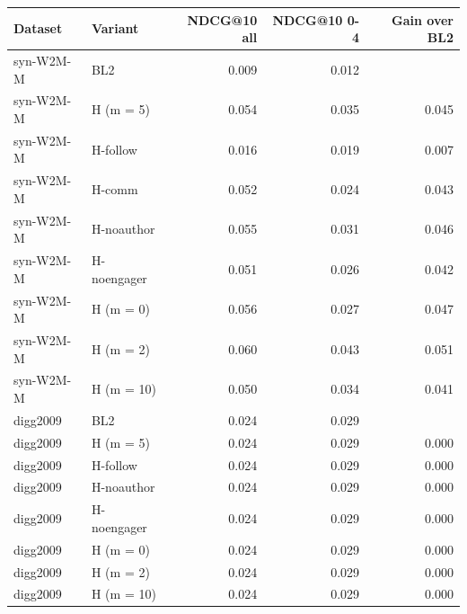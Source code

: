 \begin{tabular}{llrrr}
\toprule
Dataset & Variant & NDCG@10 all & NDCG@10 0-4 & Gain over BL2 \\
\midrule
syn-W2M-M & BL2 & 0.009 & 0.012 &  \\
syn-W2M-M & H (m = 5) & 0.054 & 0.035 & 0.045 \\
syn-W2M-M & H-follow & 0.016 & 0.019 & 0.007 \\
syn-W2M-M & H-comm & 0.052 & 0.024 & 0.043 \\
syn-W2M-M & H-noauthor & 0.055 & 0.031 & 0.046 \\
syn-W2M-M & H-noengager & 0.051 & 0.026 & 0.042 \\
syn-W2M-M & H (m = 0) & 0.056 & 0.027 & 0.047 \\
syn-W2M-M & H (m = 2) & 0.060 & 0.043 & 0.051 \\
syn-W2M-M & H (m = 10) & 0.050 & 0.034 & 0.041 \\
digg2009 & BL2 & 0.024 & 0.029 &  \\
digg2009 & H (m = 5) & 0.024 & 0.029 & 0.000 \\
digg2009 & H-follow & 0.024 & 0.029 & 0.000 \\
digg2009 & H-noauthor & 0.024 & 0.029 & 0.000 \\
digg2009 & H-noengager & 0.024 & 0.029 & 0.000 \\
digg2009 & H (m = 0) & 0.024 & 0.029 & 0.000 \\
digg2009 & H (m = 2) & 0.024 & 0.029 & 0.000 \\
digg2009 & H (m = 10) & 0.024 & 0.029 & 0.000 \\
\bottomrule
\end{tabular}
